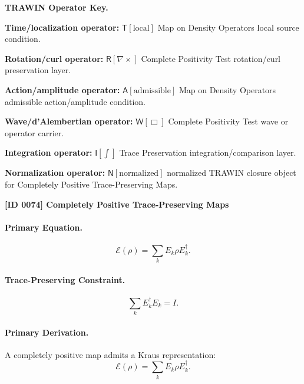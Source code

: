 \par\vspace{0.45\baselineskip}
\noindent\begin{minipage}[t]{\linewidth}
\begingroup
\small
\raggedright
\textbf{TRAWIN Operator Key.}\par
\noindent\textbf{Time/localization operator:} $\mathsf{T}\!\left[\mathrm{local}\right]$ Map on Density Operators local source condition.\par
\noindent\textbf{Rotation/curl operator:} $\mathsf{R}\!\left[\nabla\times\right]$ Complete Positivity Test rotation/curl preservation layer.\par
\noindent\textbf{Action/amplitude operator:} $\mathsf{A}\!\left[\mathrm{admissible}\right]$ Map on Density Operators admissible action/amplitude condition.\par
\noindent\textbf{Wave/d'Alembertian operator:} $\mathsf{W}\!\left[\Box\right]$ Complete Positivity Test wave or operator carrier.\par
\noindent\textbf{Integration operator:} $\mathsf{I}\!\left[\int\right]$ Trace Preservation integration/comparison layer.\par
\noindent\textbf{Normalization operator:} $\mathsf{N}\!\left[\mathrm{normalized}\right]$ normalized TRAWIN closure object for Completely Positive Trace-Preserving Maps.\par
\endgroup
\end{minipage}

\clearpage
\noindent\textbf{[ID 0074] Completely Positive Trace-Preserving Maps}\par
\vspace{0.35em}
\paragraph{Primary Equation.}
\begin{equation}
\mathcal{E}(\rho)=\sum_k E_k\rho E_k^\dagger .
\end{equation}

\paragraph{Trace-Preserving Constraint.}
\begin{equation}
\sum_k E_k^\dagger E_k = I .
\end{equation}

\paragraph{Primary Derivation.}
A completely positive map admits a Kraus representation:
\begin{equation}
\mathcal{E}(\rho)=\sum_k E_k\rho E_k^\dagger .
\end{equation}

